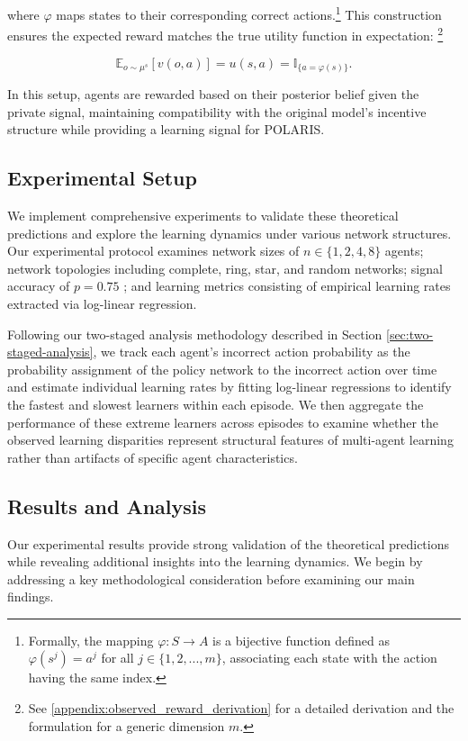 where $\varphi$ maps states to their corresponding correct actions.\footnote{Formally, the mapping $\varphi: S \rightarrow A$ is a bijective function defined as $\varphi(s^j) = a^j$ for all $j \in \{1,2,...,m\}$, associating each state with the action having the same index.} This construction ensures the expected reward matches the true utility function in expectation: \footnote{See \ref{appendix:observed_reward_derivation} for a detailed derivation and the formulation for a generic dimension $m$.}

\begin{equation*}
    \mathbb{E}_{o \sim \mu^{s}}[v(o, a)] = u(s, a) = \mathbb{I}_{\{a = \varphi(s)\}}.
\end{equation*}


In this setup, agents are rewarded based on their posterior belief given the private signal, maintaining compatibility with the original model's incentive structure while providing a learning signal for POLARIS.

\subsection{Experimental Setup}

We implement comprehensive experiments to validate these theoretical predictions and explore the learning dynamics under various network structures. Our experimental protocol examines network sizes of $n \in \{1, 2, 4, 8\}$ agents; network topologies including complete, ring, star, and random networks; signal accuracy of $p = 0.75$ \iffalse(we use the same signal accuracy as in the paper's example where $r_{\text{aut}} \approx 0.14$, $r_{\text{crd}} \approx 0.55$, and $r_{\text{bdd}} \approx 1.10$)\fi; and learning metrics consisting of empirical learning rates extracted via log-linear regression.

Following our two-staged analysis methodology described in Section \ref{sec:two-staged-analysis}, we track each agent's incorrect action probability as the probability assignment of the policy network to the incorrect action over time and estimate individual learning rates by fitting log-linear regressions to identify the fastest and slowest learners within each episode. We then aggregate the performance of these extreme learners across episodes to examine whether the observed learning disparities represent structural features of multi-agent learning rather than artifacts of specific agent characteristics.

\subsection{Results and Analysis}
\iffalse
Our experimental results provide strong validation of the theoretical predictions while revealing additional insights into the learning dynamics. We begin by addressing a key methodological consideration before examining our main findings.

